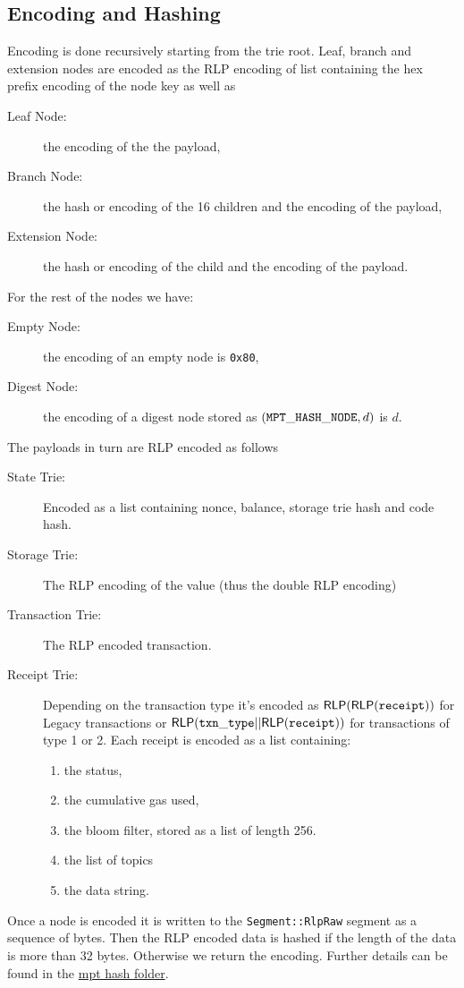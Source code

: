 \subsection{Encoding and Hashing}

Encoding is done recursively starting from the trie root. Leaf, branch and extension nodes are encoded as the RLP encoding of list containing the hex prefix encoding of the node key as well as

\begin{description}
	\item[Leaf Node:] the encoding of the the payload,
	\item[Branch Node:] the hash or encoding of the 16 children and the encoding of the payload,
	\item[Extension Node:] the hash or encoding of the child and the encoding of the payload.
\end{description}
For the rest of the nodes we have:
\begin{description}
	\item[Empty Node:] the encoding of an empty node is {\tt 0x80},
	\item[Digest Node:] the encoding of a digest node stored as $({\tt MPT\_HASH\_NODE}, d)$ is $d$.
\end{description}

The payloads in turn are RLP encoded as follows
\begin{description}
	\item[State Trie:] Encoded as a list containing nonce, balance, storage trie hash and code hash.
	\item[Storage Trie:] The RLP encoding of the value (thus the double RLP encoding)
	\item[Transaction Trie:] The RLP encoded transaction.
	\item[Receipt Trie:] Depending on the transaction type it's encoded as ${\sf RLP}({\sf RLP}({\tt receipt}))$ for Legacy transactions or ${\sf RLP}({\tt txn\_type}||{\sf RLP}({\tt receipt}))$ for transactions of type 1 or 2. Each receipt is encoded as a list containing:
	\begin{enumerate}
		\item the status,
		\item the cumulative gas used,
		\item the bloom filter, stored as a list of length 256.
		\item the list of topics
		\item the data string.
	\end{enumerate}
\end{description}

Once a node is encoded it is written to the {\tt Segment::RlpRaw} segment as a sequence of bytes. Then the RLP encoded data is hashed if the length of the data is more than 32 bytes. Otherwise we return the encoding. Further details can be found in the \href{https://github.com/0xPolygonZero/plonky2/tree/main/evm/src/cpu/mpt/hash}{mpt hash folder}.